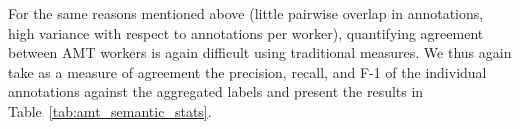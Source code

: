 \documentclass[11pt,a4paper]{article}
\begin{document}
For the same reasons mentioned above (little pairwise overlap in annotations, high variance with respect to annotations per worker), quantifying agreement between AMT workers is again difficult using traditional measures. We thus again take as a measure of agreement the precision, recall, and F-1 of the individual annotations against the aggregated labels and present the results in Table~\ref{tab:amt_semantic_stats}.
\end{document}
